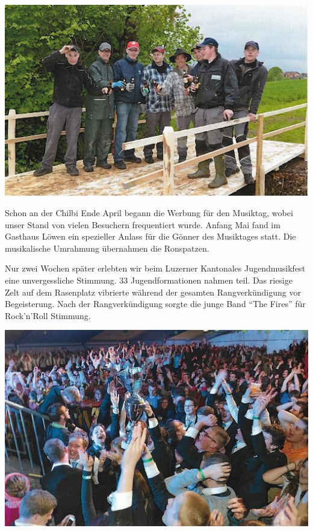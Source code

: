 \begin{history}
    \begin{MulticolFigure}
        \centering
        \includegraphics[width=0.93\linewidth]{./chap/2001-2024/2013/Bau-Marschmusikstrecke.jpg}
    \end{MulticolFigure}

    Schon an der Chilbi Ende April begann die Werbung für den Musiktag, wobei
    unser Stand von vielen Besuchern frequentiert wurde. Anfang Mai fand im
    Gasthaus Löwen ein spezieller Anlass für die Gönner des Musiktages statt.
    Die musikalische Umrahmung übernahmen die Ronspatzen.

    Nur zwei Wochen später erlebten wir beim Luzerner Kantonales Jugendmusikfest
    eine unvergessliche Stimmung. 33 Jugendformationen nahmen teil. Das riesige
    Zelt auf dem Rasenplatz vibrierte während der gesamten Rangverkündigung vor
    Begeisterung.    Nach der Rangverkündigung sorgte die junge Band
    \enquote{The Fires} für Rock'n'Roll Stimmung.

    \begin{MulticolFigure}
        \centering
        \includegraphics[width=0.93\linewidth]{./chap/2001-2024/2013/Jugendmusikfest.jpg}
    \end{MulticolFigure}


\end{history}
